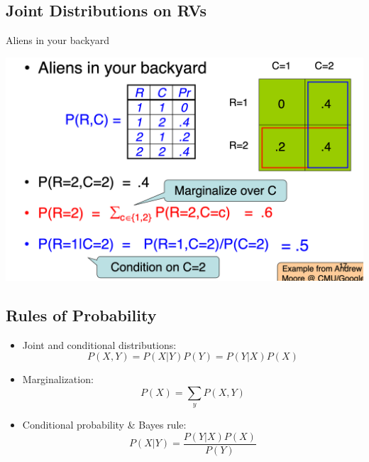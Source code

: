 \documentclass[11pt]{article}
\theoremstyle{definition}
\begin{document}
\subsection{Joint Distributions on RVs}
Aliens in your backyard

\includegraphics[width=\textwidth]{6.png}
\subsection{Rules of Probability}
\begin{itemize}
  \item Joint and conditional distributions:
  \begin{equation}
    P(X,Y) = P(X|Y)P(Y) = P(Y|X)P(X)
  \end{equation}
  \item Marginalization:
  \begin{equation}
    P(X) = \sum_{y} P(X,Y)
  \end{equation}
  \item Conditional probability \& Bayes rule:
  \begin{equation}
    P(X|Y) = \frac{P(Y|X)P(X)}{P(Y)}
  \end{equation}
\end{itemize}
\end{document}

